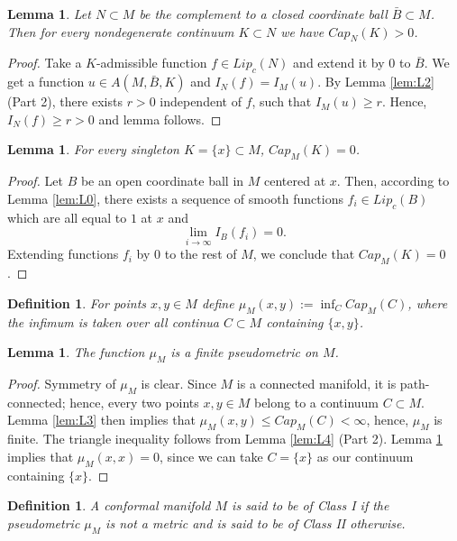 \documentclass[11pt]{article}   	%
\newtheorem{lem}[thm]{Lemma}
\newtheorem{definition}[thm]{Definition}
\begin{document}
\begin{lem}\label{lem:L5}
Let $N\subset M$ be the complement to a closed coordinate ball $\bar{B}\subset M$. Then for every nondegenerate continuum 
$K\subset N$ we have $Cap_N(K)>0$. 
\end{lem}
\begin{proof} Take a $K$-admissible function $f\in Lip_c(N)$ and extend it by $0$ to $\bar{B}$. We get a function $u\in A(M, \bar{B}, K)$ and $I_N(f)=I_M(u)$. 
By Lemma \ref{lem:L2} (Part 2), there exists $r>0$ independent of $f$, such that $I_M(u)\ge r$.  Hence, $I_N(f)\ge r>0$ and lemma follows. 
\end{proof}

\begin{lem}\label{lem:L6}
For every singleton $K=\{x\}\subset M$, $Cap_M(K)=0$. 
\end{lem}
\begin{proof} Let ${B}$ be an open coordinate ball in $M$ centered at $x$. Then, according to Lemma \ref{lem:L0},  there exists a sequence of 
smooth functions $f_i\in Lip_c(B)$ which are all equal to $1$ at $x$ and
$$
\lim_{i\to\infty} I_B(f_i)=0. 
$$
Extending functions $f_i$ by $0$ to the rest of $M$, we conclude that $Cap_M(K)=0$. 
\end{proof}

\begin{definition}
For points $x, y\in M$ define $\mu_M(x,y):= \inf_C Cap_M(C)$, where the infimum is taken over all continua $C\subset M$ containing $\{x, y\}$. 
\end{definition}

 

\begin{lem}\label{lem:L7}
The function $\mu_M$ is a finite pseudometric on $M$. 
\end{lem} 
\begin{proof} Symmetry of $\mu_M$ is clear. Since $M$ is a connected manifold, it is path-connected; 
hence, every two points $x, y\in M$ belong to a continuum $C\subset M$. 
Lemma \ref{lem:L3} then implies that $\mu_M(x,y)\le Cap_M(C)<\infty$, 
hence, $\mu_M$ is finite.  
The triangle inequality follows from Lemma \ref{lem:L4} (Part 2).  Lemma \ref{lem:L6} implies that $\mu_M(x,x)=0$, 
since we can take $C=\{x\}$ as our continuum containing $\{x\}$.  
\end{proof}

\begin{definition}
A conformal manifold $M$ is said to be of {\em Class I} if the pseudometric $\mu_M$ is not a metric and is said to be of {\em Class II} otherwise. 
\end{definition}
\end{document}
